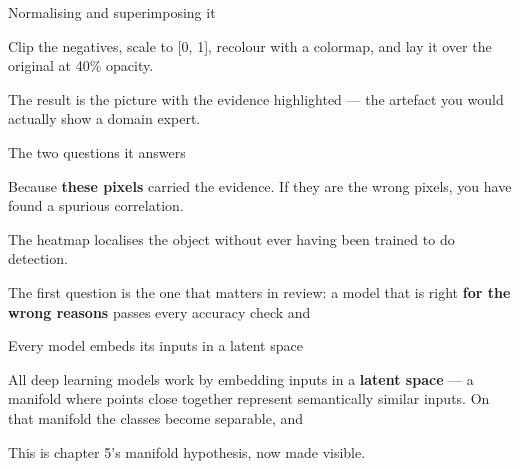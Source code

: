 \documentclass[aspectratio=169,11pt,t]{beamer}
\begin{document}
\begin{frame}[shrink=25]{Normalising and superimposing it}
{\fontsize{9.4}{12.6}\selectfont\color{fg2}Clip the negatives, scale to [0, 1], recolour with a colormap, and lay it over the original at 40\% opacity.\par}\vskip 4pt
{\fontsize{9.4}{12.6}\selectfont\color{fg2}The result is the picture with the evidence highlighted --- the artefact you would actually show a domain expert.\par}\vskip 4pt
\end{frame}

\begin{frame}[shrink=25]{The two questions it answers}
\begin{minipage}[t]{0.494\textwidth}
\begin{icardaccent}
Because \textbf{these pixels} carried the evidence. If they are the wrong pixels, you have found a spurious correlation.
\end{icardaccent}
\end{minipage}%
\hfill
\begin{minipage}[t]{0.494\textwidth}
\begin{icardaccent}
The heatmap localises the object without ever having been trained to do detection.
\end{icardaccent}
\end{minipage}%
\begin{iband}[signal]
The first question is the one that matters in review: a model that is right \textbf{for the wrong reasons} passes every accuracy check and 
\end{iband}
\end{frame}


\begin{frame}[shrink=25]{Every model embeds its inputs in a latent space}
{\fontsize{9.4}{12.6}\selectfont\color{fg2}All deep learning models work by embedding inputs in a \textbf{latent space} --- a manifold where points close together represent semantically similar inputs. On that manifold the classes become separable, and \par}\vskip 4pt
{\fontsize{9.4}{12.6}\selectfont\color{fg2}This is chapter 5's manifold hypothesis, now made visible.\par}\vskip 4pt
\end{frame}
\end{document}
